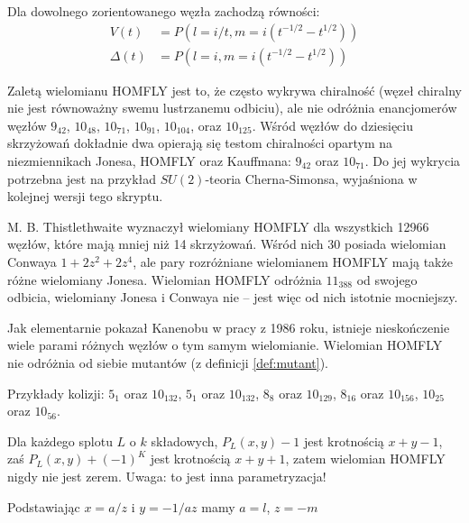 \begin{proposition}
    Dla dowolnego zorientowanego węzła zachodzą równości:
        \begin{align*}
        V(t) & = P(l = i/t, m = i(t^{-1/2} - t^{1/2})) \\
        \Delta(t) & = P(l = i, m = i(t^{-1/2} - t^{1/2}))
    \end{align*}
\end{proposition}

Zaletą wielomianu HOMFLY jest to, że często wykrywa chiralność (węzeł chiralny nie jest równoważny swemu lustrzanemu odbiciu), ale nie odróżnia enancjomerów węzłów $9_{42}$, $10_{48}$, $10_{71}$, $10_{91}$, $10_{104}$, oraz $10_{125}$.
Wśród węzłów do dziesięciu skrzyżowań dokładnie dwa opierają się testom chiralności opartym na niezmiennikach Jonesa, HOMFLY oraz Kauffmana: $9_{42}$ oraz $10_{71}$.
Do jej wykrycia potrzebna jest na przykład $SU(2)$-teoria Cherna-Simonsa, wyjaśniona w kolejnej wersji tego skryptu.

M. B. Thistlethwaite wyznaczył wielomiany HOMFLY dla wszystkich 12966 węzłów, które mają mniej niż 14 skrzyżowań.
Wśród nich 30 posiada wielomian Conwaya $1 + 2z^2 + 2z^4$, ale pary rozróżniane wielomianem HOMFLY mają także różne wielomiany Jonesa.
Wielomian HOMFLY odróżnia $11_{388}$ od swojego odbicia, wielomiany Jonesa i Conwaya nie -- jest więc od nich istotnie mocniejszy.

Jak elementarnie pokazał Kanenobu w pracy \cite{kanenobu86} z 1986 roku, istnieje nieskończenie wiele parami różnych węzłów o tym samym wielomianie.
Wielomian HOMFLY nie odróżnia od siebie mutantów (z definicji \ref{def:mutant}).

\begin{example}
    Przykłady kolizji: $5_1$ oraz $10_{132}$, $5_{1}$ oraz $10_{132}$,
    $8_{8}$ oraz $10_{129}$, $8_{16}$ oraz $10_{156}$, $10_{25}$ oraz $10_{56}$.
\end{example}


Dla każdego splotu $L$ o $k$ składowych, $P_L(x,y) - 1$ jest krotnością $x+y-1$, zaś $P_L(x,y) + (-1)^K$ jest krotnością $x +y + 1$, zatem wielomian HOMFLY nigdy nie jest zerem.
Uwaga: to jest inna parametryzacja!

Podstawiając $x = a/z$ i $y = -1/az$ mamy $a = l$, $z = -m$
